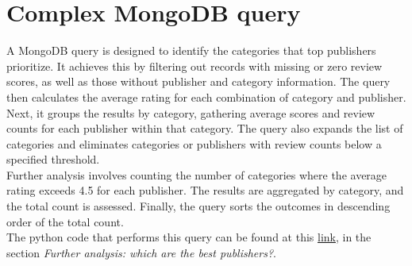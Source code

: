 
\section{Complex MongoDB query}

A MongoDB query is designed to identify the categories that top publishers prioritize.
It achieves this by filtering out records with missing or zero review scores,
as well as those without publisher and category information.
The query then calculates the average rating for each combination of category and publisher. \\
Next, it groups the results by category, gathering average scores and review counts for each publisher
within that category. The query also expands the list of categories and eliminates categories or
publishers with review counts below a specified threshold.\\
Further analysis involves counting the number of categories where the average rating exceeds 4.5 for each publisher.
The results are aggregated by category, and the total count is assessed. Finally, the query sorts the outcomes
in descending order of the total count.\\
The python code that performs this query can be found at this \href{https://github.com/DavideLigari01/data-science-project/blob/main/notebooks/hypotesis_testing/hypothesis_6.ipynb}{link},
in the section \textit{Further analysis: which are the best publishers?}.